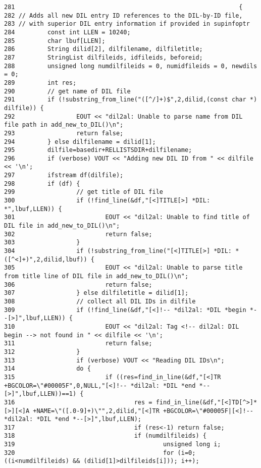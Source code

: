 \footnotesize\begin{verbatim}281                                                              {
282 // Adds all new DIL entry ID references to the DIL-by-ID file,
283 // with superior DIL entry information if provided in supinfoptr
284         const int LLEN = 10240;
285         char lbuf[LLEN];
286         String dilid[2], dilfilename, dilfiletitle;
287         StringList dilfileids, idfileids, beforeid;
288         unsigned long numdilfileids = 0, numidfileids = 0, newdils = 0;
289         int res;
290         // get name of DIL file
291         if (!substring_from_line("([^/]+)$",2,dilid,(const char *) dilfile)) {
292                 EOUT << "dil2al: Unable to parse name from DIL file path in add_new_to_DIL()\n";
293                 return false;
294         } else dilfilename = dilid[1];
295         dilfile=basedir+RELLISTSDIR+dilfilename;
296         if (verbose) VOUT << "Adding new DIL ID from " << dilfile << '\n';
297         ifstream df(dilfile);
298         if (df) {
299                 // get title of DIL file
300                 if (!find_line(&df,"[<]TITLE[>] *DIL: *",lbuf,LLEN)) {
301                         EOUT << "dil2al: Unable to find title of DIL file in add_new_to_DIL()\n";
302                         return false;
303                 }
304                 if (!substring_from_line("[<]TITLE[>] *DIL: *([^<]+)",2,dilid,lbuf)) {
305                         EOUT << "dil2al: Unable to parse title from title line of DIL file in add_new_to_DIL()\n";
306                         return false;
307                 } else dilfiletitle = dilid[1];
308                 // collect all DIL IDs in dilfile
309                 if (!find_line(&df,"[<]!-- *dil2al: *DIL *begin *--[>]",lbuf,LLEN)) {
310                         EOUT << "dil2al: Tag <!-- dil2al: DIL begin --> not found in " << dilfile << '\n';
311                         return false;
312                 }
313                 if (verbose) VOUT << "Reading DIL IDs\n";
314                 do {
315                         if ((res=find_in_line(&df,"[<]TR +BGCOLOR=\"#00005F",0,NULL,"[<]!-- *dil2al: *DIL *end *--[>]",lbuf,LLEN))==1) {
316                                 res = find_in_line(&df,"[<]TD[^>]*[>][<]A +NAME=\"([.0-9]+)\"",2,dilid,"[<]TR +BGCOLOR=\"#00005F|[<]!-- *dil2al: *DIL *end *--[>]",lbuf,LLEN);
317                                 if (res<-1) return false;
318                                 if (numdilfileids) {
319                                         unsigned long i;
320                                         for (i=0; ((i<numdilfileids) && (dilid[1]>dilfileids[i])); i++);

\end{verbatim}
